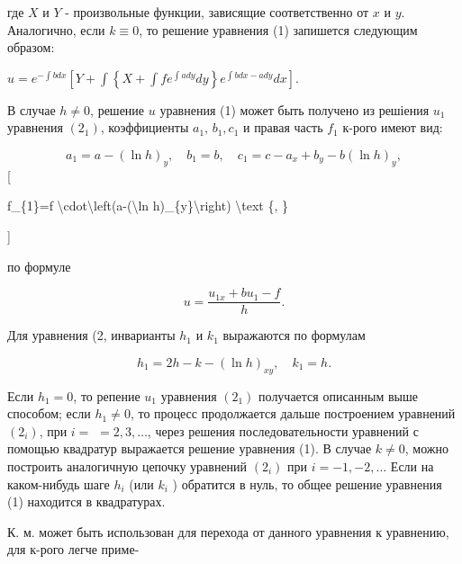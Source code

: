 \documentclass[10pt]{article}
\begin{document}
где $X$ и $Y$ - произвольные функции, зависящие соответственно от $x$ и $y$. Аналогично, если $k \equiv 0$, то решение уравнения (1) запишется следующим образом:



$u=e^{-\int b d x}\left[Y+\int\left\{X+\int f e^{\int a d y} d y\right\} e^{\int b d x-a d y} d x\right]$.



В случае $h \neq 0$, решение $u$ уравнения (1) может быть получено из решіения $u_{1}$ уравнения $\left(2_{1}\right)$, коэффициенты $a_{1}$, $b_{1}, c_{1}$ и правая часть $f_{1}$ к-рого имеют вид:



\[

a_{1}=a-(\ln h)_{y}, \quad b_{1}=b, \quad c_{1}=c-a_{x}+b_{y}-b(\ln h)_{y},

\][



f\_\{1\}=f \textbackslash cdot\textbackslash left(a-(\textbackslash ln h)\_\{y\}\textbackslash right) \textbackslash text \{, \}

]



по формуле



\[

u=\frac{u_{1 x}+b u_{1}-f}{h} .

\]



Для уравнения (2, инварианты $h_{1}$ и $k_{1}$ выражаются по формулам



\[

h_{1}=2 h-k-(\ln h)_{x y}, \quad k_{1}=h .

\]



Если $h_{1}=0$, то репение $u_{1}$ уравнения $\left(2_{1}\right)$ получается описанным выше способом; если $h_{1} \neq 0$, то процесс продолжается дальше построением уравнений $\left(2_{i}\right)$, при $i=$ $=2,3, \ldots$, через решения последовательности уравнений с помощью квадратур выражается решение уравнения (1). В случае $k \neq 0$, можно построить аналогичную цепочку уравнений $\left(2_{i}\right)$ при $i=-1,-2, \ldots$ Если на каком-нибудь шаге $h_{i}$ (или $k_{i}$ ) обратится в нуль, то общее решение уравнения (1) находится в квадратурах.



К. м. может быть использован для перехода от данного уравнения к уравнению, для к-рого легче приме-
\end{document}
